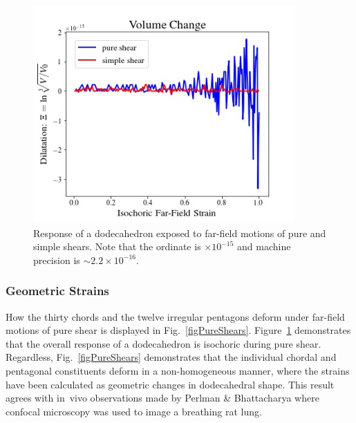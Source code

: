\begin{figure}
	\centering
	\includegraphics[width=10cm]{figures/isochoric.jpg}
	\caption{Response of a dodecahedron exposed to far-field motions of pure and simple shears.  Note that the ordinate is $\times 10^{-15}$ and machine precision is $\sim 2.2 \times 10^{-16}$.}
	\label{figIsochoric}
\end{figure}

\subsubsection{Geometric Strains}

How the thirty chords and the twelve irregular pentagons deform under far-field motions of pure shear is displayed in Fig.~\ref{figPureShears}.  Figure~\ref{figIsochoric} demonstrates that the overall response of a dodecahedron is isochoric during pure shear.  Regardless, Fig.~\ref{figPureShears} demonstrates that the individual chordal and pentagonal constituents deform in a non-homogeneous manner, where the strains have been calculated as geometric changes in dodecahedral shape.  This result agrees with in~vivo observations made by Perlman \& Bhattacharya \cite{PerlmanBhattacharya07} where confocal microscopy was used to image a breathing rat lung.

